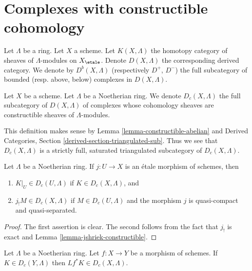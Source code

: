 \section{Complexes with constructible cohomology}
\label{section-Dc}

\noindent
Let $\Lambda$ be a ring. Let $X$ a scheme. Let $K(X, \Lambda)$ the
homotopy category of sheaves of $\Lambda$-modules on $X_\etale$.
Denote $D(X, \Lambda)$ the corresponding derived category.
We denote by $D^b(X, \Lambda)$ (respectively $D^+$, $D^-$)
the full subcategory of bounded (resp. above, below) complexes in
$D(X, \Lambda)$.

\begin{definition}
\label{definition-c}
Let $X$ be a scheme. Let $\Lambda$ be a Noetherian ring.
We denote {\it $D_c(X, \Lambda)$} the full subcategory
of $D(X, \Lambda)$ of complexes whose cohomology sheaves
are constructible sheaves of $\Lambda$-modules.
\end{definition}

\noindent
This definition makes sense by Lemma \ref{lemma-constructible-abelian} and
Derived Categories, Section \ref{derived-section-triangulated-sub}.
Thus we see that $D_c(X, \Lambda)$ is a strictly full, saturated
triangulated subcategory of $D_c(X, \Lambda)$.

\begin{lemma}
\label{lemma-restrict-and-shriek-from-etale-c}
Let $\Lambda$ be a Noetherian ring.
If $j : U \to X$ is an \'etale morphism of schemes, then
\begin{enumerate}
\item $K|_U \in D_c(U, \Lambda)$ if $K \in D_c(X, \Lambda)$, and
\item $j_!M \in D_c(X, \Lambda)$ if $M \in D_c(U, \Lambda)$ and
the morphism $j$ is quasi-compact and quasi-separated.
\end{enumerate}
\end{lemma}

\begin{proof}
The first assertion is clear. The second follows from the fact
that $j_!$ is exact and 
Lemma \ref{lemma-jshriek-constructible}.
\end{proof}

\begin{lemma}
\label{lemma-pullback-c}
Let $\Lambda$ be a Noetherian ring.
Let $f : X \to Y$ be a morphism of schemes. If $K \in D_c(Y, \Lambda)$
then $Lf^*K \in D_c(X, \Lambda)$.
\end{lemma}

